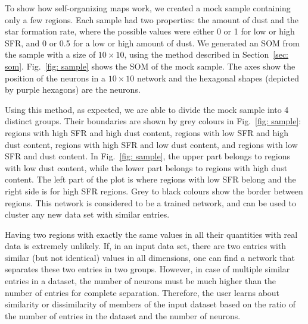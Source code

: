To show how self-organizing maps work, we created a mock sample containing only a few regions.
Each sample had two properties: the amount of dust and the star formation rate, where the possible values were
either 0 or 1 for low or high SFR, and 0 or 0.5 for a low or high amount of dust. 
 We generated an SOM from the sample with a size of $10 \times 10$, using the method described in Section~\ref{sec: som}.
 Fig.~\ref{fig: sample} shows the SOM of the mock sample. 
 The axes show the position of the neurons in a $10 \times 10$ network and the hexagonal shapes (depicted by purple hexagons) are the neurons.
 
Using this method, as expected, we are able to divide the mock sample into 4 distinct groups. Their boundaries are shown by grey colours in Fig.~\ref{fig: sample}: regions with high SFR and high dust content, regions with low SFR and high dust content, regions with high SFR and low dust content, and regions with low SFR and dust content. 
In Fig.~\ref{fig: sample}, the upper part belongs to regions with low dust content, while the lower part belongs to regions with high dust content.
The left part of the plot is where regions with low SFR belong and the right side is for high SFR regions.
Grey to black colours show the border between regions.
This network is considered to be a trained network, and can be used to cluster any new data set with similar entries.

Having two regions with exactly the same values in all their quantities with real data is extremely unlikely. 
If, in an input data set, there are two entries with similar (but not identical) values in all dimensions, one can find a network that separates these two entries in two groups.  
However, in case of multiple similar entries in a dataset, the number of neurons must be much higher than the number of entries for complete separation.
Therefore, the user learns about similarity or dissimilarity of members of the input dataset based on the ratio of the number of entries in the dataset and  the number of neurons. 
